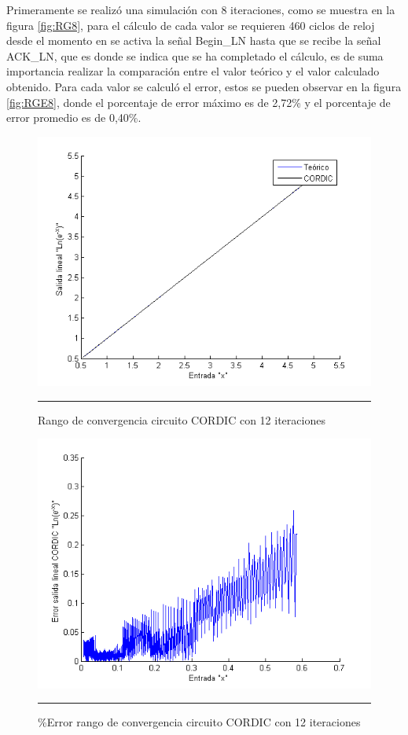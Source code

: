 Primeramente se realizó una simulación con 8 iteraciones, como se muestra en la figura \ref{fig:RG8}, para el cálculo de cada valor se requieren 460 ciclos de reloj desde el momento en se activa la señal Begin\_LN hasta que se recibe la señal ACK\_LN, que es donde se indica que se ha completado el cálculo, es de suma importancia realizar la comparación entre el valor teórico y el valor calculado obtenido. Para cada valor se calculó el error, estos se pueden observar en la figura \ref{fig:RGE8}, donde el porcentaje de error máximo es de 2,72\% y el porcentaje de error promedio es de 0,40\%. 
 




\begin{figure}[H]
  \centering
    \includegraphics[scale=0.7]{./RANGO_12iter.png}
    \rule{35em}{0.5pt}
  \caption[Rango de convergencia circuito CORDIC con 12 iteraciones]{Rango de convergencia circuito CORDIC con 12 iteraciones   }
  \label{fig:RG12}
\end{figure}

\begin{figure}[H]
  \centering
    \includegraphics[scale=0.7]{./RANGO_12iter_ERROR.png}
    \rule{35em}{0.5pt}
  \caption[\%Error rango de convergencia circuito CORDIC con 12 iteraciones]{\%Error rango de convergencia circuito CORDIC con 12 iteraciones }
  \label{fig:RGE12}
\end{figure}

